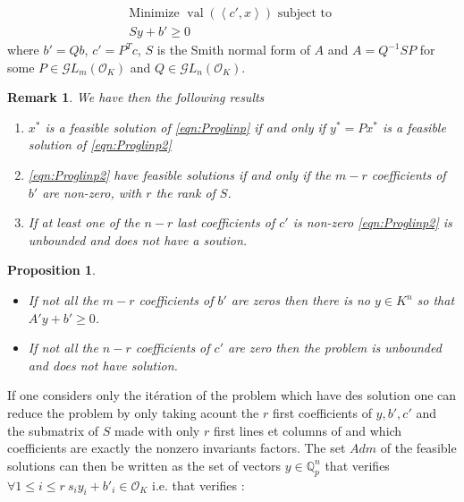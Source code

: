 \documentclass[a4paper,12pt]{article}
\newtheorem{proposition}{Proposition}
\newtheorem{remark}{Remark}
\DeclareMathOperator{\val}{val}
\newcommand{\OK}{\mathcal{O}_K}
\begin{document}
\begin{equation}
	\tag{PLp'}
	\begin{matrix}
		\text{Minimize } \val\left(\left<c',x \right>\right) \text{ subject to }\\
		Sy + b' \ge 0
	\end{matrix}
	\label{eqn:Proglinp2}
\end{equation}
where $b' = Qb$, $c' = P^Tc$, $S$ is the Smith normal form of $A$ and $A = Q^{-1} S P$ for some $P \in \mathcal{G}L_m\left( \OK \right)$ and $ Q \in \mathcal{G}L_n\left( \OK \right)$.

\begin{remark}
	
	We have then the following results
	\begin{enumerate}
		\item $x^*$ is a feasible solution of \ref{eqn:Proglinp} if and only if $y^* = P x^*$ is a feasible solution of \ref{eqn:Proglinp2}
		\item \ref{eqn:Proglinp2} have feasible solutions if and only if the $m-r$ coefficients of $b'$ are non-zero, with $r$ the rank of $S$.
		\item If at least one of the $n-r$ last coefficients of $c'$ is non-zero \ref{eqn:Proglinp2} is unbounded and does not have a soution.
	\end{enumerate}
	
\end{remark}

\begin{proposition}
	\begin{itemize}~
		
		\item[$\circ$] If not all the $m-r$ coefficients of $b'$ are zeros then there is no $y \in K ^n$ so that $A'y+b' \ge  0$.
		\item[$\circ$] If not all the $n-r$ coefficients of $c'$ are zero then the problem is unbounded and does not have solution. \end{itemize} 
\end{proposition}
If one considers only the itération of the problem which have des solution one can reduce the problem by only taking acount the $r$ first coefficients of $y, b', c'$ and the submatrix of $S$ made with only $r$ first lines et columns of and which coefficients are exactly the nonzero invariants factors. The set $Adm$ of the feasible solutions can then be written as the set of vectors $y \in \mathbb{Q}_{ p } ^n$ that verifies $\forall 1 \le i\le r \ s_i y_i + b'_i \in \OK$ i.e. that verifies :
\end{document}
